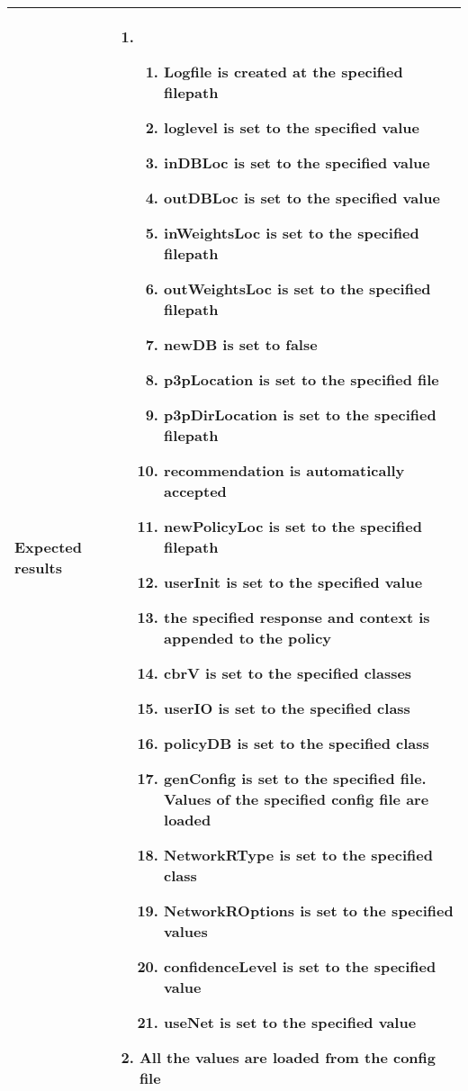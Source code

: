 \begin{center}
\begin{longtable}{ | p{4cm} | p{10cm} | }
			Expected results & 	\begin{enumerate}
							\item
							\begin{enumerate}
								\item Logfile is created at the specified filepath
								\item loglevel is set to the specified value
								\item inDBLoc is set to the specified value
								\item outDBLoc is set to the specified value
								\item inWeightsLoc is set to the specified filepath
								\item outWeightsLoc is set to the specified filepath
								\item newDB is set to false
								\item p3pLocation is set to the specified file
								\item p3pDirLocation is set to the specified filepath
								\item recommendation is automatically accepted
								\item newPolicyLoc is set to the specified filepath
								\item userInit is set to the specified value
								\item the specified response and context is appended to the policy
								\item cbrV is set to the specified classes
								\item userIO is set to the specified class
								\item policyDB is set to the specified class
								\item genConfig is set to the specified file. Values of the specified config file are loaded
								\item NetworkRType is set to the specified class
								\item NetworkROptions is set to the specified values
								\item confidenceLevel is set to the specified value
								\item useNet is set to the specified value
							\end{enumerate}
							\item All the values are loaded from the config file
						\end{enumerate} \\ [3pt] \hline


\end{longtable}
\end{center}
